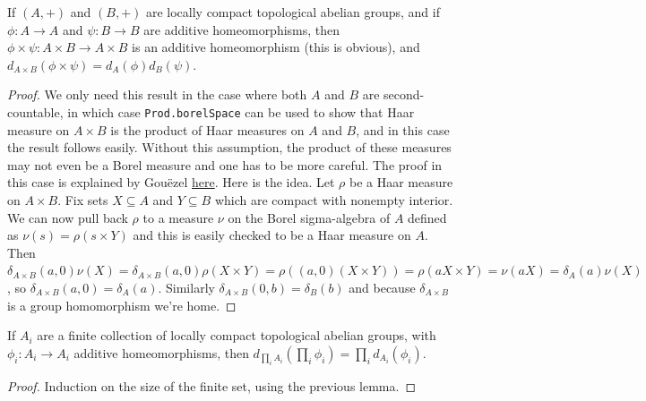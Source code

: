 \begin{lemma}
  \label{MeasureTheory.addEquivAddHaarChar_prodCongr}
  \leanok
  If $(A,+)$ and $(B,+)$ are locally compact topological abelian groups,
  and if $\phi:A\to A$ and $\psi:B\to B$ are additive homeomorphisms,
  then $\phi\times\psi:A\times B\to A\times B$ is an additive homeomorphism (this is
  obvious), and
  $d_{A\times B}(\phi\times\psi)=d_A(\phi)d_B(\psi)$.
\end{lemma}
\begin{proof}
  We only need this result in the case where both $A$ and $B$ are second-countable, in which case
  {\tt Prod.borelSpace} can be used to show that Haar measure on $A\times B$ is the product of
  Haar measures on $A$ and $B$, and in this case the result follows easily. Without this assumption,
  the product of these measures may not even be a Borel measure and one has to be more careful.
  The proof in this case is explained by Gou\"{e}zel
  \href{https://leanprover.zulipchat.com/#narrow/channel/116395-maths/topic/Product.20of.20Borel.20spaces/near/487257981}{here}.
  Here is the idea. Let $\rho$ be a Haar measure on $A\times B$. Fix sets $X\subseteq A$ and
  $Y\subseteq B$ which are compact with nonempty interior. We can now pull back $\rho$
  to a measure $\nu$ on the Borel sigma-algebra of $A$ defined as $\nu(s)=\rho(s\times Y)$
  and this is easily checked to be a Haar measure on $A$. Then
  $\delta_{A\times B}(a,0)\nu(X)=
  \delta_{A\times B}(a,0)\rho(X\times Y)=\rho((a,0)(X\times Y))=
  \rho(aX\times Y)=\nu(aX)=\delta_A(a)\nu(X)$
  , so $\delta_{A\times B}(a,0)=\delta_A(a)$.
  Similarly $\delta_{A\times B}(0,b)=\delta_B(b)$ and because $\delta_{A\times B}$ is a group
  homomorphism we're home.
\end{proof}

\begin{lemma}
  \label{MeasureTheory.addEquivAddHaarChar_piCongrRight}
  \leanok
  If $A_i$ are a finite collection of locally compact topological abelian groups,
  with $\phi_i:A_i\to A_i$ additive homeomorphisms, then $d_{\prod_i A_i}(\prod_i\phi_i)=\prod_i d_{A_i}(\phi_i)$.
\end{lemma}
\begin{proof}
  Induction on the size of the finite set, using the previous lemma.
\end{proof}

